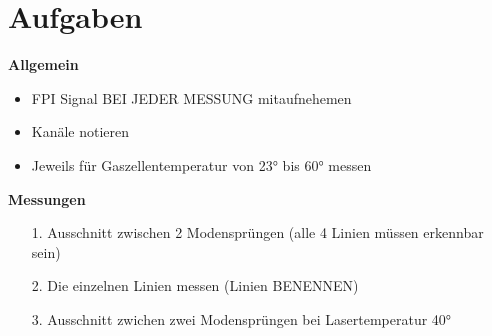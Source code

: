 \documentclass[a4paper, twoside]{article}
\begin{document}
\section{Aufgaben}
\textbf{Allgemein}
\begin{itemize}
    \item FPI Signal BEI JEDER MESSUNG mitaufnehemen
    \item Kanäle notieren
    \item Jeweils für Gaszellentemperatur von 23° bis 60° messen
\end{itemize}
\textbf{Messungen}
\begin{itemize}
    \item[1.] Ausschnitt zwischen 2 Modensprüngen (alle 4 Linien müssen erkennbar sein)
    \item[2.] Die einzelnen Linien messen (Linien BENENNEN)
    \item[3.] Ausschnitt zwichen zwei Modensprüngen bei Lasertemperatur 40° 
\end{itemize}
\end{document}
